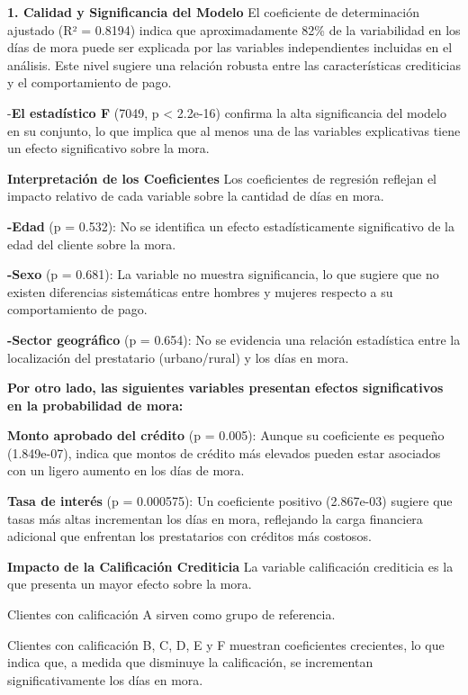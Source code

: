 \documentclass[Royal,times,sageh]{sagej}
\begin{document}
\textbf{1. Calidad y Significancia del Modelo} El coeficiente de
determinación ajustado (R² = 0.8194) indica que aproximadamente 82\% de
la variabilidad en los días de mora puede ser explicada por las
variables independientes incluidas en el análisis. Este nivel sugiere
una relación robusta entre las características crediticias y el
comportamiento de pago.

-\textbf{El estadístico F} (7049, p \textless{} 2.2e-16) confirma la
alta significancia del modelo en su conjunto, lo que implica que al
menos una de las variables explicativas tiene un efecto significativo
sobre la mora.

\textbf{Interpretación de los Coeficientes} Los coeficientes de
regresión reflejan el impacto relativo de cada variable sobre la
cantidad de días en mora.

\textbf{-Edad} (p = 0.532): No se identifica un efecto estadísticamente
significativo de la edad del cliente sobre la mora.

\textbf{-Sexo} (p = 0.681): La variable no muestra significancia, lo que
sugiere que no existen diferencias sistemáticas entre hombres y mujeres
respecto a su comportamiento de pago.

\textbf{-Sector geográfico} (p = 0.654): No se evidencia una relación
estadística entre la localización del prestatario (urbano/rural) y los
días en mora.

\textbf{Por otro lado, las siguientes variables presentan efectos
significativos en la probabilidad de mora:}

\textbf{Monto aprobado del crédito} (p = 0.005): Aunque su coeficiente
es pequeño (1.849e-07), indica que montos de crédito más elevados pueden
estar asociados con un ligero aumento en los días de mora.

\textbf{Tasa de interés} (p = 0.000575): Un coeficiente positivo
(2.867e-03) sugiere que tasas más altas incrementan los días en mora,
reflejando la carga financiera adicional que enfrentan los prestatarios
con créditos más costosos.

\textbf{Impacto de la Calificación Crediticia} La variable calificación
crediticia es la que presenta un mayor efecto sobre la mora.

Clientes con calificación A sirven como grupo de referencia.

Clientes con calificación B, C, D, E y F muestran coeficientes
crecientes, lo que indica que, a medida que disminuye la calificación,
se incrementan significativamente los días en mora.
\end{document}
